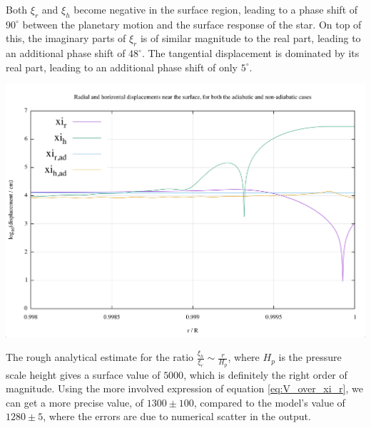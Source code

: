 \documentclass[a0,portrait]{a0poster}
\begin{document}
\begin{multicols}{2}
Both $\xi_{r}$ and $\xi_{h}$ become negative in the surface region, leading to a phase shift of $90^{\circ}$ between the planetary motion and the surface response of the star. On top of this, the imaginary parts of $\xi_{r}$ is of similar magnitude to the real part, leading to an additional phase shift of $48^{\circ}$. The tangential displacement is dominated by its real part, leading to an additional phase shift of only $5^{\circ}$.

\begin{center}\vspace{1cm}
\includegraphics[width=1.0\linewidth]{poster_displacements}
\end{center}\vspace{1cm}

The rough analytical estimate for the ratio $\frac{\xi_{h}}{\xi_{r}} \sim \frac{r}{H_{p}}$, where $H_{p}$ is the pressure scale height gives a surface value of $5000$, which is definitely the right order of magnitude. Using the more involved expression of equation \ref{eq:V_over_xi_r}, we can get a more precise value, of $1300 \pm 100$, compared to the model's value of $1280 \pm 5$, where the errors are due to numerical scatter in the output.


\end{multicols}
\end{document}
